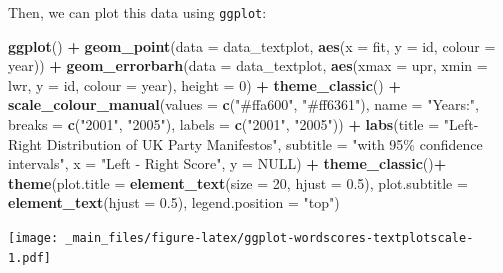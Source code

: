 \documentclass[
]{book}
\newenvironment{Shaded}{\begin{snugshade}}{\end{snugshade}}
\newcommand{\AttributeTok}[1]{\textcolor[rgb]{0.13,0.29,0.53}{#1}}
\newcommand{\ConstantTok}[1]{\textcolor[rgb]{0.56,0.35,0.01}{#1}}
\newcommand{\DecValTok}[1]{\textcolor[rgb]{0.00,0.00,0.81}{#1}}
\newcommand{\FloatTok}[1]{\textcolor[rgb]{0.00,0.00,0.81}{#1}}
\newcommand{\FunctionTok}[1]{\textcolor[rgb]{0.13,0.29,0.53}{\textbf{#1}}}
\newcommand{\NormalTok}[1]{#1}
\newcommand{\SpecialCharTok}[1]{\textcolor[rgb]{0.81,0.36,0.00}{\textbf{#1}}}
\newcommand{\StringTok}[1]{\textcolor[rgb]{0.31,0.60,0.02}{#1}}
\begin{document}
Then, we can plot this data using \texttt{ggplot}:

\begin{Shaded}
\begin{Highlighting}[]
\FunctionTok{ggplot}\NormalTok{() }\SpecialCharTok{+}
 \FunctionTok{geom\_point}\NormalTok{(}\AttributeTok{data =}\NormalTok{ data\_textplot,}
            \FunctionTok{aes}\NormalTok{(}\AttributeTok{x =}\NormalTok{ fit, }\AttributeTok{y =}\NormalTok{ id, }\AttributeTok{colour =}\NormalTok{ year)) }\SpecialCharTok{+}
 \FunctionTok{geom\_errorbarh}\NormalTok{(}\AttributeTok{data =}\NormalTok{ data\_textplot,}
                \FunctionTok{aes}\NormalTok{(}\AttributeTok{xmax =}\NormalTok{ upr, }\AttributeTok{xmin =}\NormalTok{ lwr, }\AttributeTok{y =}\NormalTok{ id, }\AttributeTok{colour =}\NormalTok{ year),}
                \AttributeTok{height =} \DecValTok{0}\NormalTok{) }\SpecialCharTok{+}
 \FunctionTok{theme\_classic}\NormalTok{() }\SpecialCharTok{+}
 \FunctionTok{scale\_colour\_manual}\NormalTok{(}\AttributeTok{values =} \FunctionTok{c}\NormalTok{(}\StringTok{"\#ffa600"}\NormalTok{, }\StringTok{"\#ff6361"}\NormalTok{),}
                     \AttributeTok{name =} \StringTok{"Years:"}\NormalTok{,}
                     \AttributeTok{breaks =} \FunctionTok{c}\NormalTok{(}\StringTok{"2001"}\NormalTok{, }\StringTok{"2005"}\NormalTok{),}
                     \AttributeTok{labels =} \FunctionTok{c}\NormalTok{(}\StringTok{"2001"}\NormalTok{, }\StringTok{"2005"}\NormalTok{)) }\SpecialCharTok{+}
 \FunctionTok{labs}\NormalTok{(}\AttributeTok{title =} \StringTok{"Left{-}Right Distribution of UK Party Manifestos"}\NormalTok{,}
      \AttributeTok{subtitle =} \StringTok{"with 95\% confidence intervals"}\NormalTok{,}
      \AttributeTok{x =} \StringTok{"Left {-} Right Score"}\NormalTok{,}
      \AttributeTok{y =} \ConstantTok{NULL}\NormalTok{) }\SpecialCharTok{+}
 \FunctionTok{theme\_classic}\NormalTok{()}\SpecialCharTok{+}
 \FunctionTok{theme}\NormalTok{(}\AttributeTok{plot.title =} \FunctionTok{element\_text}\NormalTok{(}\AttributeTok{size =} \DecValTok{20}\NormalTok{, }\AttributeTok{hjust =} \FloatTok{0.5}\NormalTok{),}
       \AttributeTok{plot.subtitle =} \FunctionTok{element\_text}\NormalTok{(}\AttributeTok{hjust =} \FloatTok{0.5}\NormalTok{),}
       \AttributeTok{legend.position =} \StringTok{"top"}\NormalTok{)}
\end{Highlighting}
\end{Shaded}

\texttt{[image: \_main\_files/figure-latex/ggplot-wordscores-textplotscale-1.pdf]}
\end{document}
